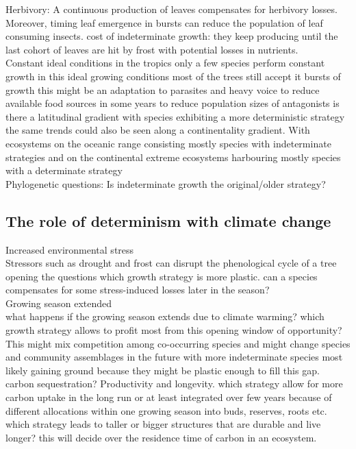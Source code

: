 \documentclass{article}
\begin{document}
	Herbivory: A continuous production of leaves compensates for herbivory losses. Moreover, timing leaf emergence in bursts can reduce the population of leaf consuming insects.
	cost of indeterminate growth: they keep producing until the last cohort of leaves are hit by frost with potential losses in nutrients. \\
	Constant ideal conditions in the tropics only a few species perform constant growth in this ideal growing conditions most of the trees still accept it bursts of growth this might be an adaptation to parasites and heavy voice to reduce available food sources in some years to reduce population sizes of antagonists is there a latitudinal gradient with species exhibiting a more deterministic strategy the same trends could also be seen along a continentality gradient. With ecosystems on the oceanic range consisting mostly species with indeterminate strategies and on the continental extreme ecosystems harbouring mostly species with a determinate strategy\\
	
	Phylogenetic questions: Is indeterminate growth the original/older strategy?\\
	
	\subsection*{The role of determinism with climate change}
	Increased environmental stress\\
	Stressors such as drought and frost can disrupt the phenological cycle of a tree opening the questions which growth strategy is more plastic. can a species compensates for some stress-induced losses later in the season?\\
	
	Growing season extended\\
	what happens if the growing season extends due to climate warming? which growth strategy allows to profit most from this opening window of opportunity? This might mix competition among co-occurring species and might change species and community assemblages in the future with more indeterminate species most likely gaining ground because they might be plastic enough to fill this gap. \\
	carbon sequestration? Productivity and longevity. which strategy allow for more carbon uptake in the long run or at least integrated over few years because of different allocations within one growing season into buds, reserves, roots etc.
	which strategy leads to taller or bigger structures that are durable and live longer? this will decide over the residence time of carbon in an ecosystem.
	\\
	\pagebreak
\end{document}
